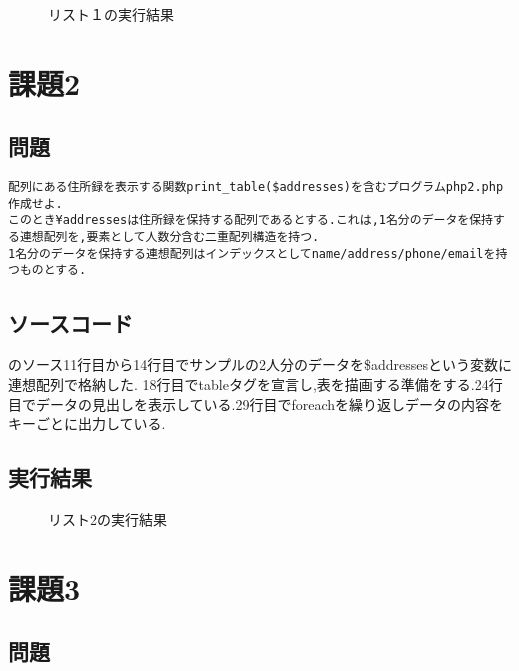 \documentclass[a4j,10pt]{jsarticle}
\begin{document}
\begin{figure}[H]
  \centering
  \caption{リスト１の実行結果}
  \label{fig:boat1}
\end{figure}

\section{課題2}


\subsection{問題}

\begin{verbatim}
配列にある住所録を表示する関数print_table($addresses)を含むプログラムphp2.php作成せよ.
このとき¥addressesは住所録を保持する配列であるとする.これは,1名分のデータを保持する連想配列を,要素として人数分含む二重配列構造を持つ.
1名分のデータを保持する連想配列はインデックスとしてname/address/phone/emailを持つものとする.
\end{verbatim}
\subsection{ソースコード}



のソース11行目から14行目でサンプルの2人分のデータを\$addressesという変数に連想配列で格納した.
18行目でtableタグを宣言し,表を描画する準備をする.24行目でデータの見出しを表示している.29行目でforeachを繰り返しデータの内容をキーごとに出力している.

\subsection{実行結果}

\begin{figure}[H]
  \centering
  \caption{リスト2の実行結果}
  \label{fig:boat1}
\end{figure}

\section{課題3}


\subsection{問題}
\end{document}
